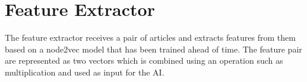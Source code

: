 \section{Feature Extractor}
The feature extractor receives a pair of articles and extracts features from them based on a node2vec model that has been trained ahead of time. The feature pair are represented as two vectors which is combined using an operation such as multiplication  and used as input for the AI.

